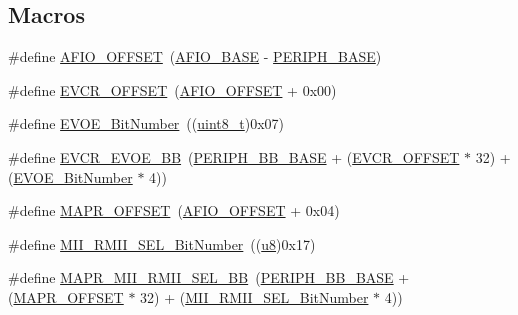 \subsection*{Macros}
\begin{DoxyCompactItemize}
\item 
\#define \hyperlink{group___g_p_i_o___private___defines_ga0ecdd0dd5180e1ee385c22f66a2cd660}{A\+F\+I\+O\+\_\+\+O\+F\+F\+S\+ET}~(\hyperlink{openmotestm_2library_2inc_2stm32f10x__map_8h_a5f7e3eacfcf4c313c25012795148a680}{A\+F\+I\+O\+\_\+\+B\+A\+SE} -\/ \hyperlink{openmotestm_2library_2inc_2stm32f10x__map_8h_a9171f49478fa86d932f89e78e73b88b0}{P\+E\+R\+I\+P\+H\+\_\+\+B\+A\+SE})
\item 
\#define \hyperlink{group___g_p_i_o___private___defines_gaf8c24f39392c89142f1b97a418669d5d}{E\+V\+C\+R\+\_\+\+O\+F\+F\+S\+ET}~(\hyperlink{openmotestm_2library_2src_2stm32f10x__gpio_8c_a0ecdd0dd5180e1ee385c22f66a2cd660}{A\+F\+I\+O\+\_\+\+O\+F\+F\+S\+ET} + 0x00)
\item 
\#define \hyperlink{group___g_p_i_o___private___defines_ga8e4fdee57fe3447cdbc5d00ccab60c18}{E\+V\+O\+E\+\_\+\+Bit\+Number}~((\hyperlink{_p_e___types_8h_aba7bc1797add20fe3efdf37ced1182c5}{uint8\+\_\+t})0x07)
\item 
\#define \hyperlink{group___g_p_i_o___private___defines_ga6e4f8c4e3def38811ac6c03b4f64240b}{E\+V\+C\+R\+\_\+\+E\+V\+O\+E\+\_\+\+BB}~(\hyperlink{openmotestm_2library_2inc_2stm32f10x__map_8h_aed7efc100877000845c236ccdc9e144a}{P\+E\+R\+I\+P\+H\+\_\+\+B\+B\+\_\+\+B\+A\+SE} + (\hyperlink{openmotestm_2library_2src_2stm32f10x__gpio_8c_af8c24f39392c89142f1b97a418669d5d}{E\+V\+C\+R\+\_\+\+O\+F\+F\+S\+ET} $\ast$ 32) + (\hyperlink{openmotestm_2library_2src_2stm32f10x__gpio_8c_a8e4fdee57fe3447cdbc5d00ccab60c18}{E\+V\+O\+E\+\_\+\+Bit\+Number} $\ast$ 4))
\item 
\#define \hyperlink{group___g_p_i_o___private___defines_ga472f80f63d09e365d283675f3466c8a1}{M\+A\+P\+R\+\_\+\+O\+F\+F\+S\+ET}~(\hyperlink{openmotestm_2library_2src_2stm32f10x__gpio_8c_a0ecdd0dd5180e1ee385c22f66a2cd660}{A\+F\+I\+O\+\_\+\+O\+F\+F\+S\+ET} + 0x04)
\item 
\#define \hyperlink{group___g_p_i_o___private___defines_gad4a9bbd669109039291f942d923ff8ae}{M\+I\+I\+\_\+\+R\+M\+I\+I\+\_\+\+S\+E\+L\+\_\+\+Bit\+Number}~((\hyperlink{agilefox_2library_2inc_2stm32f10x__type_8h_aed742c436da53c1080638ce6ef7d13de}{u8})0x17)
\item 
\#define \hyperlink{group___g_p_i_o___private___defines_ga00e75433e8a45d7a55c021397cb85aa9}{M\+A\+P\+R\+\_\+\+M\+I\+I\+\_\+\+R\+M\+I\+I\+\_\+\+S\+E\+L\+\_\+\+BB}~(\hyperlink{openmotestm_2library_2inc_2stm32f10x__map_8h_aed7efc100877000845c236ccdc9e144a}{P\+E\+R\+I\+P\+H\+\_\+\+B\+B\+\_\+\+B\+A\+SE} + (\hyperlink{group___g_p_i_o___private___defines_ga472f80f63d09e365d283675f3466c8a1}{M\+A\+P\+R\+\_\+\+O\+F\+F\+S\+ET} $\ast$ 32) + (\hyperlink{group___g_p_i_o___private___defines_gad4a9bbd669109039291f942d923ff8ae}{M\+I\+I\+\_\+\+R\+M\+I\+I\+\_\+\+S\+E\+L\+\_\+\+Bit\+Number} $\ast$ 4))

\end{DoxyCompactItemize}
